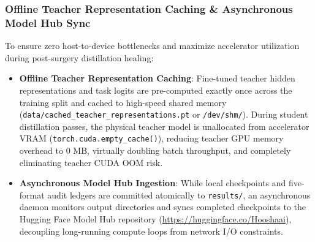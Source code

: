 \subsubsection{Offline Teacher Representation Caching \& Asynchronous Model Hub Sync}
\label{sec:setup_cached_kd_upload}
To ensure zero host-to-device bottlenecks and maximize accelerator utilization during post-surgery distillation healing:
\begin{itemize}
    \item \textbf{Offline Teacher Representation Caching}: Fine-tuned teacher hidden representations and task logits are pre-computed exactly once across the training split and cached to high-speed shared memory (\texttt{data/cached\_teacher\_representations.pt} or \texttt{/dev/shm/}). During student distillation passes, the physical teacher model is unallocated from accelerator VRAM (\texttt{torch.cuda.empty\_cache()}), reducing teacher GPU memory overhead to $0\text{ MB}$, virtually doubling batch throughput, and completely eliminating teacher CUDA OOM risk.
    \item \textbf{Asynchronous Model Hub Ingestion}: While local checkpoints and five-format audit ledgers are committed atomically to \texttt{results/}, an asynchronous daemon monitors output directories and syncs completed checkpoints to the Hugging Face Model Hub repository (\url{https://huggingface.co/Hooshaai}), decoupling long-running compute loops from network I/O constraints.
\end{itemize}
